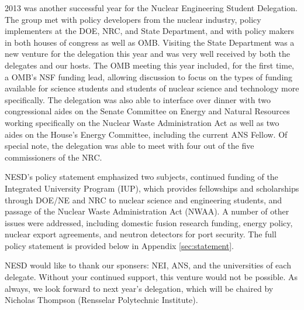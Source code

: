 
2013 was another successful year for the Nuclear Engineering Student
Delegation. The group met with policy developers from the nuclear industry,
policy implementers at the DOE, NRC, and State Department, and with policy
makers in both houses of congress as well as OMB. Visiting the State Department
was a new venture for the delegation this year and was very well received by
both the delegates and our hosts. The OMB meeting this year included, for the
first time, a OMB's NSF funding lead, allowing discussion to focus on the types
of funding available for science students and students of nuclear science and
technology more specifically. The delegation was also able to interface over
dinner with two congressional aides on the Senate Committee on Energy and
Natural Resources working specifically on the Nuclear Waste Administration Act
as well as two aides on the House's Energy Committee, including the current ANS
Fellow. Of special note, the delegation was able to meet with four out of the
five commissioners of the NRC.

NESD's policy statement emphasized two subjects, continued funding of the
Integrated University Program (IUP), which provides fellowships and scholarships
through DOE/NE and NRC to nuclear science and engineering students, and passage
of the Nuclear Waste Administration Act (NWAA). A number of other issues were
addressed, including domestic fusion research funding, energy policy, nuclear
export agreements, and neutron detectors for port security. The full policy
statement is provided below in Appendix \ref{sec:statement}.

NESD would like to thank our sponsers: NEI, ANS, and the universities of each
delegate. Without your continued support, this venture would not be possible. As
always, we look forward to next year's delegation, which will be chaired by
Nicholas Thompson (Rensselar Polytechnic Institute).
